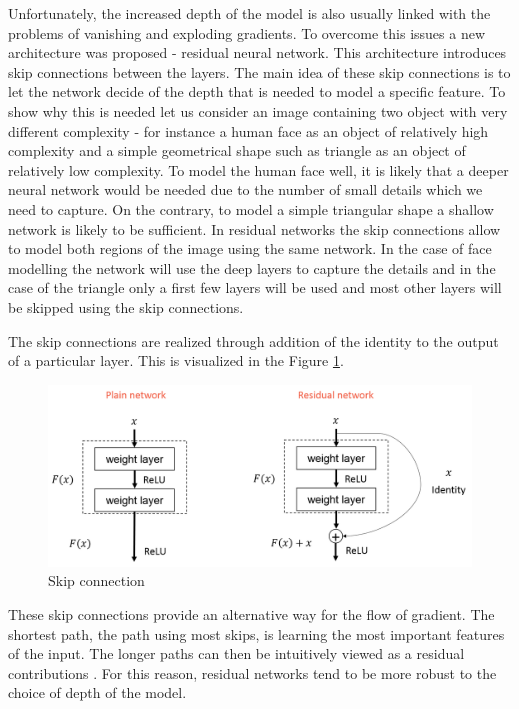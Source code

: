 Unfortunately, the increased depth of the model is also usually linked with the problems of vanishing and exploding gradients.
To overcome this issues a new architecture was proposed - residual neural network.
This architecture introduces skip connections between the layers. 
The main idea of these skip connections is to let the network decide of the depth that is needed to model a specific feature.
To show why this is needed let us consider an image containing two object with very different complexity - for instance a human face as an object of relatively high complexity and a simple geometrical shape such as triangle as an object of relatively low complexity.
To model the human face well, it is likely that a deeper neural network would be needed due to the number of small details which we need to capture.
On the contrary, to model a simple triangular shape a shallow network is likely to be sufficient.
In residual networks the skip connections allow to model both regions of the image using the same network.
In the case of face modelling the network will use the deep layers to capture the details and in the case of the triangle only a first few layers will be used and most other layers will be skipped using the skip connections.

The skip connections are realized through addition of the identity to the output of a particular layer.
This is visualized in the Figure \ref{fig:skip_connection}.
\begin{figure}
    \centering
    \includegraphics[width=\linewidth]{imgs_andy/skip_connection.png}
    \caption{Skip connection}
    \label{fig:skip_connection}
\end{figure}
These skip connections provide an alternative way for the flow of gradient.
The shortest path, the path using most skips, is learning the most important features of the input.
The longer paths can then be intuitively viewed as a residual contributions \cite{he2016deep}.
For this reason, residual networks tend to be more robust to the choice of depth of the model.
    

\newpage